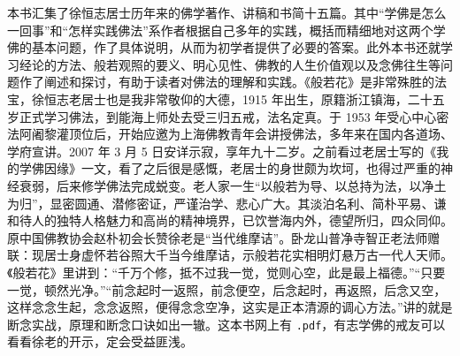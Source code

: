 \begin{book}
    本书汇集了徐恒志居士历年来的佛学著作、讲稿和书简十五篇。其中“学佛是怎么一回事”和“怎样实践佛法”系作者根据自己多年的实践，概括而精细地对这两个学佛的基本问题，作了具体说明，从而为初学者提供了必要的答案。此外本书还就学习经论的方法、般若观照的要义、明心见性、佛教的人生价值观以及念佛往生等问题作了阐述和探讨，有助于读者对佛法的理解和实践。《般若花》是非常殊胜的法宝，徐恒志老居士也是我非常敬仰的大德，1915 年出生，原籍浙江镇海，二十五岁正式学习佛法，到能海上师处去受三归五戒，法名定真。于 1953 年受心中心密法阿阇黎灌顶位后，开始应邀为上海佛教青年会讲授佛法，多年来在国内各道场、学府宣讲。2007 年 3 月 5 日安详示寂，享年九十二岁。之前看过老居士写的《我的学佛因缘》一文，看了之后很是感慨，老居士的身世颇为坎坷，也得过严重的神经衰弱，后来修学佛法完成蜕变。老人家一生“以般若为导、以总持为法，以净土为归”，显密圆通、潜修密证，严谨治学、悲心广大。其淡泊名利、简朴平易、谦和待人的独特人格魅力和高尚的精神境界，已饮誉海内外，德望所归，四众同仰。原中国佛教协会赵朴初会长赞徐老是“当代维摩诘”。卧龙山普净寺智正老法师赠联：现居士身虚怀若谷照大千当今维摩诘，示般若花实相明灯悬万古一代人天师。《般若花》里讲到：“千万个修，抵不过我一觉，觉则心空，此是最上福德。”“只要一觉，顿然光净。”“前念起时一返照，前念便空，后念起时，再返照，后念又空，这样念念生起，念念返照，便得念念空净，这实是正本清源的调心方法。”讲的就是断念实战，原理和断念口诀如出一辙。这本书网上有 \texttt{.pdf}，有志学佛的戒友可以看看徐老的开示，定会受益匪浅。
\end{book}
